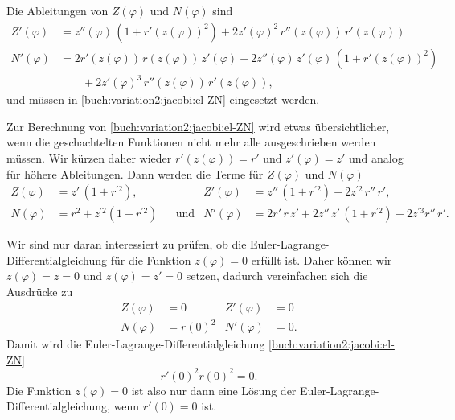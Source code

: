 Die Ableitungen von $Z(\varphi)$ und $N(\varphi)$ sind
\begin{align*}
Z'(\varphi)
&=
z''(\varphi)\,(1+r'(z(\varphi))^2)
+
2
z'(\varphi)^2\,r''(z(\varphi))\,r'(z(\varphi))
\\
N'(\varphi)
&=
2 r'(z(\varphi))\, r(z(\varphi))\, z'(\varphi)
+
2 z''(\varphi)\,z'(\varphi)\,(1+r'(z(\varphi))^2)
\\
&\qquad
+
2 z'(\varphi)^3\, r''(z(\varphi))\, r'(z(\varphi)),
\end{align*}
und müssen in \eqref{buch:variation2:jacobi:el-ZN} eingesetzt
werden. 

Zur Berechnung von \eqref{buch:variation2:jacobi:el-ZN} wird
etwas übersichtlicher, wenn die geschachtelten Funktionen nicht
mehr alle ausgeschrieben werden müssen.
Wir kürzen daher wieder $r'(z(\varphi)) = r'$ und $z'(\varphi)=z'$
und analog für höhere Ableitungen.
Dann werden die Terme für $Z(\varphi)$ und $N(\varphi)$
\begin{align*}
Z(\varphi)
&=
z'\,(1+r^{\prime 2}),
&&&
Z'(\varphi)
&=
z''\,(1+r^{\prime 2}) + 2z^{\prime 2}\,r''\,r',
\\
N(\varphi)
&=
r^2 + z^{\prime 2}(1+r^{\prime 2})
&&\text{und}&
N'(\varphi)
&=
2r'\,r\,z' + 2 z''\,z'\,(1+r^{\prime 2})+2 z^{\prime 3} r''\,r'.
\end{align*}

Wir sind nur daran interessiert zu prüfen, ob die
Euler-Lagrange-Differentialgleichung für die Funktion $z(\varphi)=0$
erfüllt ist.
Daher können wir $z(\varphi)=z=0$ und $z(\varphi)=z'=0$ setzen, dadurch
vereinfachen sich die Ausdrücke zu
\begin{align*}
Z(\varphi) &= 0
&
Z'(\varphi)
&=0
\\
N(\varphi) &= r(0)^2
&
N'(\varphi) &= 0.
\end{align*}
Damit wird die Euler-Lagrange-Differentialgleichung
\eqref{buch:variation2:jacobi:el-ZN}
\begin{equation}
r'(0)^2 r(0)^2 = 0.
\end{equation}
Die Funktion $z(\varphi)=0$ ist also nur dann eine Lösung der
Euler-Lagrange-Differential\-glei\-chung, wenn $r'(0)=0$ ist.

%
%
